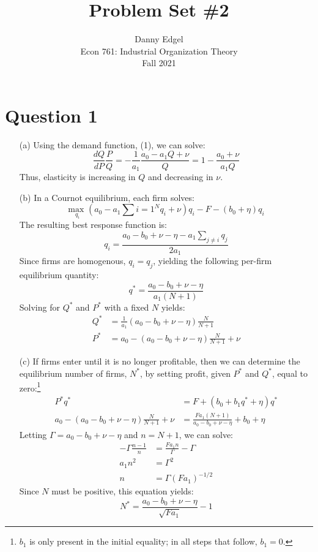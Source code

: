 \documentclass{article}
\newcommand{\usmax}[1]{\underset{#1}{\text{max }}}
\begin{document}
\title{	Problem Set \#2 }
\author{ 	Danny Edgel 					        	      \\ 
			Econ 761: Industrial Organization Theory	\\
			Fall 2021						                      \\
		}
\maketitle\thispagestyle{empty}



\section*{Question 1}
\begin{itemize}
    \item[(a)] Using the demand function, (1), we can solve: \[
    \frac{dQ}{dP}\frac{P}{Q} = -\frac{1}{a_1}\frac{a_0 - a_1Q + \nu}{Q} = 1 - \frac{a_0 + \nu}{a_1Q}
    \] 
    Thus, elasticity is increasing in $Q$ and decreasing in $\nu$.

    \item[(b)] In a Cournot equilibrium, each firm solves:\[
      \usmax{q_i}\left(a_0 - a_1\sum{i=1}^Nq_i + \nu\right)q_i - F - (b_0+\eta)q_i
    \]
    The resulting best response function is:\[
      q_i = \frac{a_0-b_0+\nu-\eta-a_1\sum_{j\neq i}q_j}{2a_1}
    \]
    Since firms are homogenous, $q_i=q_j$, yielding the following per-firm equilibrium quantity:\[
      q^* = \frac{a_0-b_0+\nu-\eta}{a_1(N+1)}
    \]
    Solving for $Q^*$ and $P^*$ with a fixed $N$ yields:\begin{align*}
      Q^* &= \frac{1}{a_1}\left(a_0-b_0+\nu-\eta\right)\frac{N}{N+1} \\ 
      P^* &= a_0 - \left(a_0-b_0+\nu-\eta\right)\frac{N}{N+1} + \nu
    \end{align*}
    \item[(c)] If firms enter until it is no longer profitable, then we can determine the equilibrium number of firms, $N^*$, by setting profit, given $P^*$ and $Q^*$, equal to zero:\footnote{$b_1$ is only present in the initial equality; in all steps that follow, ${b_1=0}$.} \begin{align*} 
      P^*q^*&= F  + (b_0 + b_1q^* + \eta)q^* \\
      a_0-(a_0-b_0+\nu-\eta)\frac{N}{N+1} + \nu &= \frac{Fa_1(N+1)}{a_0-b_0 + \nu - \eta}+b_0+\eta
    \end{align*}
    Letting ${\Gamma=a_0-b_0 + \nu - \eta}$ and ${n=N+1}$, we can solve:\begin{align*}
      -\Gamma\frac{n-1}{n} &= \frac{Fa_1n}{\Gamma} - \Gamma   \\
      a_1n^2 &= \Gamma^2                                      \\
      n &= \Gamma (Fa_1)^{-1/2}
    \end{align*}
    Since $N$ must be positive, this equation yields: \[
      N^* = \frac{a_0 - b_0 + \nu - \eta}{\sqrt{Fa_1}} - 1
    \]


\end{itemize}
\end{document}
